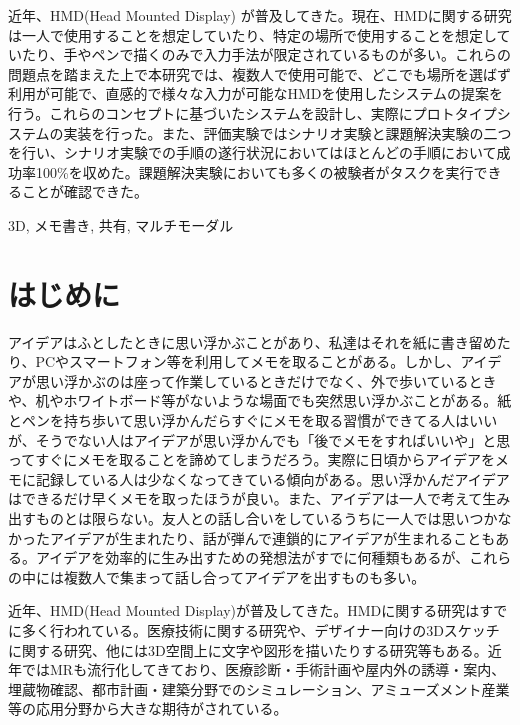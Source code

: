 \documentclass[technicalreport]{ieicej}
\begin{document}
\begin{jabstract}
近年、HMD(Head Mounted Display) が普及してきた。現在、HMDに関する研究は一人で使用することを想定していたり、特定の場所で使用することを想定していたり、手やペンで描くのみで入力手法が限定されているものが多い。これらの問題点を踏まえた上で本研究では、複数人で使用可能で、どこでも場所を選ばず利用が可能で、直感的で様々な入力が可能なHMDを使用したシステムの提案を行う。これらのコンセプトに基づいたシステムを設計し、実際にプロトタイプシステムの実装を行った。また、評価実験ではシナリオ実験と課題解決実験の二つを行い、シナリオ実験での手順の遂行状況においてはほとんどの手順において成功率100\%を収めた。課題解決実験においても多くの被験者がタスクを実行できることが確認できた。
\end{jabstract}
\begin{jkeyword}
3D, メモ書き, 共有, マルチモーダル
\end{jkeyword}
\maketitle

\section{はじめに}
アイデアはふとしたときに思い浮かぶことがあり、私達はそれを紙に書き留めたり、PCやスマートフォン等を利用してメモを取ることがある。しかし、アイデアが思い浮かぶのは座って作業しているときだけでなく、外で歩いているときや、机やホワイトボード等がないような場面でも突然思い浮かぶことがある。紙とペンを持ち歩いて思い浮かんだらすぐにメモを取る習慣ができてる人はいいが、そうでない人はアイデアが思い浮かんでも「後でメモをすればいいや」と思ってすぐにメモを取ることを諦めてしまうだろう。実際に日頃からアイデアをメモに記録している人は少なくなってきている傾向がある。思い浮かんだアイデアはできるだけ早くメモを取ったほうが良い。また、アイデアは一人で考えて生み出すものとは限らない。友人との話し合いをしているうちに一人では思いつかなかったアイデアが生まれたり、話が弾んで連鎖的にアイデアが生まれることもある。アイデアを効率的に生み出すための発想法がすでに何種類もあるが、これらの中には複数人で集まって話し合ってアイデアを出すものも多い。

近年、HMD(Head Mounted Display)が普及してきた。HMDに関する研究はすでに多く行われている。医療技術に関する研究や、デザイナー向けの3Dスケッチに関する研究、他には3D空間上に文字や図形を描いたりする研究等もある。近年ではMRも流行化してきており、医療診断・手術計画や屋内外の誘導・案内、埋蔵物確認、都市計画・建築分野でのシミュレーション、アミューズメント産業等の応用分野から大きな期待がされている。
\end{document}
